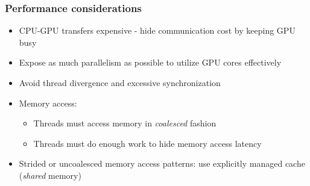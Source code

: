 \begin{frame}
\frametitle{Performance considerations}
\begin{itemize}
\item CPU-GPU transfers expensive -
    hide communication cost by keeping GPU busy
\item Expose as much parallelism as possible
    to utilize GPU cores effectively
\item Avoid thread divergence and excessive
    synchronization
\item Memory access:
    \begin{itemize}
        \item Threads must access memory in \emph{coalesced}
            fashion
        \item Threads must do enough work to hide
            memory access latency
    \end{itemize}
\item Strided or uncoalesced memory access patterns:
    use explicitly managed cache (\emph{shared} memory)
\end{itemize}
\end{frame}

